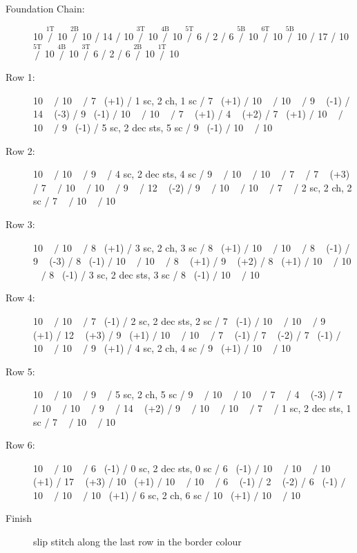\documentclass[openany]{book}
\newcommand{\ch}{}%
\renewcommand{\sc}{}%
\newcommand{\m}[1]{$\stackrel{{\text{#1}}}{/}$}
\begin{document}
\begin{description}
\item[Foundation Chain:]
10 \ch \m{1T}
10 \ch \m{2B}
10 \ch /  14 \ch /  10 \m{3T}
10 \ch \m{4B}
10 \ch \m{5T}
6 \ch / 2 \ch / 6 \m{5B}
10 \ch \m{6T}
10 \ch \m{5B}
10 \ch / 17 \ch / 10 \m{5T}
10 \ch \m{4B}
10 \ch \m{3T}
6 \ch /  2 \ch /  6 \m{2B}
10 \ch \m{1T}
10 \ch 
\item[Row 1:]
10 \sc~ \m{}
10 \sc~ \m{}
7 \sc~(+1) /  1 sc, 2 ch, 1 sc /  7 \sc~(+1) \m{}
10 \sc~ \m{}
10 \sc~ \m{}
9 \sc~ (-1)  /  14 \sc~ (-3)  /  9 \sc~(-1) \m{}
10 \sc~ \m{}
10 \sc~ \m{}
7 \sc~ (+1)  /  4 \sc~ (+2)  /  7 \sc~(+1) \m{}
10 \sc~ \m{}
10 \sc~ \m{}
9 \sc~(-1) /  5 sc, 2 dec sts, 5 sc /  9 \sc~(-1) \m{}
10 \sc~ \m{}
10 \sc~ 
\item[Row 2:]
10 \sc~ \m{}
10 \sc~ \m{}
9 \sc~ /  4 sc, 2 dec sts, 4 sc /  9 \sc~ \m{}
10 \sc~ \m{}
10 \sc~ \m{}
7 \sc~   /  7 \sc~ (+3)  /  7 \sc~ \m{}
10 \sc~ \m{}
10 \sc~ \m{}
9 \sc~   /  12 \sc~ (-2)  /  9 \sc~ \m{}
10 \sc~ \m{}
10 \sc~ \m{}
7 \sc~ /  2 sc, 2 ch, 2 sc /  7 \sc~ \m{}
10 \sc~ \m{}
10 \sc~ 
\item[Row 3:]
10 \sc~ \m{}
10 \sc~ \m{}
8 \sc~(+1) /  3 sc, 2 ch, 3 sc /  8 \sc~(+1) \m{}
10 \sc~ \m{}
10 \sc~ \m{}
8 \sc~ (-1)  /  9 \sc~ (-3)  /  8 \sc~(-1) \m{}
10 \sc~ \m{}
10 \sc~ \m{}
8 \sc~ (+1)  /  9 \sc~ (+2)  /  8 \sc~(+1) \m{}
10 \sc~ \m{}
10 \sc~ \m{}
8 \sc~(-1) /  3 sc, 2 dec sts, 3 sc /  8 \sc~(-1) \m{}
10 \sc~ \m{}
10 \sc~ 
\item[Row 4:]
10 \sc~ \m{}
10 \sc~ \m{}
7 \sc~(-1) /  2 sc, 2 dec sts, 2 sc /  7 \sc~(-1) \m{}
10 \sc~ \m{}
10 \sc~ \m{}
9 \sc~ (+1)  /  12 \sc~ (+3)  /  9 \sc~(+1) \m{}
10 \sc~ \m{}
10 \sc~ \m{}
7 \sc~ (-1)  /  7 \sc~ (-2)  /  7 \sc~(-1) \m{}
10 \sc~ \m{}
10 \sc~ \m{}
9 \sc~(+1) /  4 sc, 2 ch, 4 sc /  9 \sc~(+1) \m{}
10 \sc~ \m{}
10 \sc~ 
\item[Row 5:]
10 \sc~ \m{}
10 \sc~ \m{}
9 \sc~ /  5 sc, 2 ch, 5 sc /  9 \sc~ \m{}
10 \sc~ \m{}
10 \sc~ \m{}
7 \sc~   /  4 \sc~ (-3)  /  7 \sc~ \m{}
10 \sc~ \m{}
10 \sc~ \m{}
9 \sc~   /  14 \sc~ (+2)  /  9 \sc~ \m{}
10 \sc~ \m{}
10 \sc~ \m{}
7 \sc~ /  1 sc, 2 dec sts, 1 sc /  7 \sc~ \m{}
10 \sc~ \m{}
10 \sc~ 
\item[Row 6:]
10 \sc~ \m{}
10 \sc~ \m{}
6 \sc~(-1) /  0 sc, 2 dec sts, 0 sc /  6 \sc~(-1) \m{}
10 \sc~ \m{}
10 \sc~ \m{}
10 \sc~ (+1)  /  17 \sc~ (+3)  /  10 \sc~(+1) \m{}
10 \sc~ \m{}
10 \sc~ \m{}
6 \sc~ (-1)  /  2 \sc~ (-2)  /  6 \sc~(-1) \m{}
10 \sc~ \m{}
10 \sc~ \m{}
10 \sc~(+1) /  6 sc, 2 ch, 6 sc /  10 \sc~(+1) \m{}
10 \sc~ \m{}
10 \sc~ 
 \item[Finish] slip stitch along the last row in the border colour
 \end{description}
\end{document}
